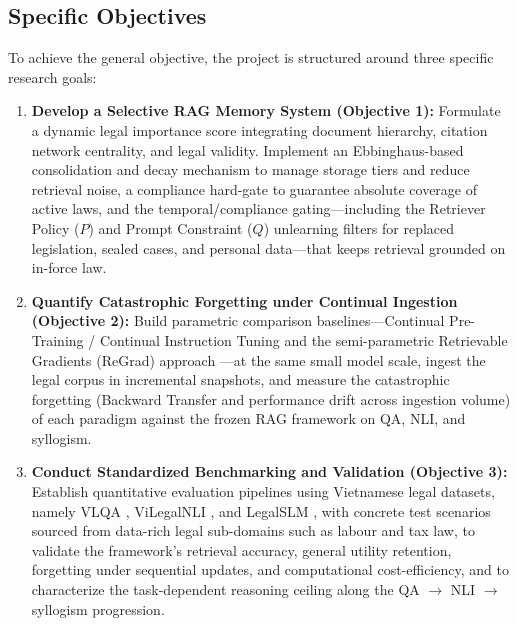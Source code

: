\subsection{Specific Objectives}
To achieve the general objective, the project is structured around three specific research goals:
\begin{enumerate}
    \item \textbf{Develop a Selective RAG Memory System (Objective 1):} Formulate a dynamic legal importance score integrating document hierarchy, citation network centrality, and legal validity. Implement an Ebbinghaus-based consolidation and decay mechanism to manage storage tiers and reduce retrieval noise, a compliance hard-gate to guarantee absolute coverage of active laws, and the temporal/compliance gating---including the Retriever Policy ($P$) and Prompt Constraint ($Q$) unlearning filters for replaced legislation, sealed cases, and personal data---that keeps retrieval grounded on in-force law.
    \item \textbf{Quantify Catastrophic Forgetting under Continual Ingestion (Objective 2):} Build parametric comparison baselines---Continual Pre-Training / Continual Instruction Tuning and the semi-parametric Retrievable Gradients (ReGrad) approach \parencite{su2026retrievablegradientscontinualposttraining}---at the same small model scale, ingest the legal corpus in incremental snapshots, and measure the catastrophic forgetting (Backward Transfer and performance drift across ingestion volume) of each paradigm against the frozen RAG framework on QA, NLI, and syllogism.
    \item \textbf{Conduct Standardized Benchmarking and Validation (Objective 3):} Establish quantitative evaluation pipelines using Vietnamese legal datasets, namely VLQA \parencite{nguyen2025vlqacomprehensivelargehighquality}, ViLegalNLI \parencite{duong2026vilegalnlinaturallanguageinference}, and LegalSLM \parencite{le-etal-2025-overview}, with concrete test scenarios sourced from data-rich legal sub-domains such as labour and tax law, to validate the framework's retrieval accuracy, general utility retention, forgetting under sequential updates, and computational cost-efficiency, and to characterize the task-dependent reasoning ceiling along the QA $\rightarrow$ NLI $\rightarrow$ syllogism progression.
\end{enumerate}
